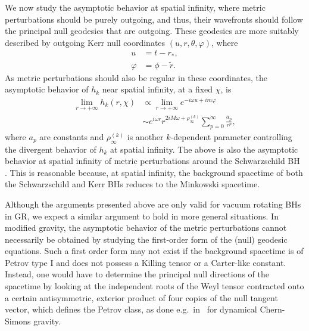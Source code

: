 \documentclass[aps,prx,amsmath,floats,floatfix,twocolumn,
  superscriptaddress,nofootinbib,showpacs]{revtex4-1}
\begin{document}
We now study the asymptotic behavior at spatial infinity, where metric perturbations should be purely outgoing, and thus, their wavefronts should follow the principal null geodesics that are outgoing. 
These geodesics are more suitably described by outgoing Kerr null coordinates $(u, r, \theta, \varphi)$, where
\begin{equation}
\begin{split}
u & = t - r_*, \\
\varphi & = \phi - \tilde{r}. 
\end{split}
\end{equation}
As metric perturbations should also be regular in these coordinates, the asymptotic behavior of $h_k$ near spatial infinity, at a fixed $\chi$, is
\begin{equation}
\label{eq:asymptotic_limits2}
\begin{split}
\lim \limits_{r \rightarrow + \infty} h_k (r, \chi)  & \propto \lim \limits_{r \rightarrow + \infty} e^{- i \omega u + i m \varphi}\\
& \sim e^{i \omega r} r^{2 i M \omega  + \rho_{\infty}^{(k)}} \sum^{\infty}_{p=0}\frac{a_{p}}{r^p},  
\end{split}
\end{equation}
where $a_{p}$ are constants and $\rho_{\infty}^{(k)}$ is another $k$-dependent parameter controlling the divergent behavior of $h_{k}$ at spatial infinity.
The above is also the asymptotic behavior at spatial infinity of metric perturbations around the Schwarzschild BH \cite{Chung:2023zdq}.
This is reasonable because, at spatial infinity, the background spacetime of both the Schwarzschild and Kerr BHs reduces to the Minkowski spacetime.

Although the arguments presented above are only valid for vacuum rotating BHs in GR, we expect a similar argument to hold in more general situations. In modified gravity, the asymptotic behavior of the metric perturbations cannot necessarily be obtained by studying the first-order form of the (null) geodesic equations. Such a first order form may not exist if the background spacetime is of Petrov type I and does not possess a Killing tensor or a Carter-like constant. Instead, one would have to determine the principal null directions of the spacetime by looking at the independent roots of the Weyl tensor contracted onto a certain antisymmetric, exterior product of four copies of the null tangent vector, which defines the Petrov class, as done e.g.~in~\cite{Owen:2021eez} for dynamical Chern-Simons gravity. 
\end{document}
